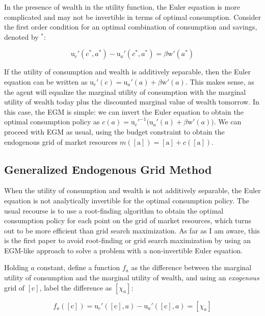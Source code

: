 \documentclass{article}
\newcommand{\DiscFac}{\beta}
\newcommand{\uFunc}{\mathrm{u}}
\newcommand{\aNrm}{a}
\newcommand{\cNrm}{c}
\newcommand{\mNrm}{m}
\newcommand{\wFunc}{\mathrm{w}}
\newcommand{\aMat}{[\mathrm{a}]}
\newcommand{\cMat}{[\mathrm{\cNrm}]}
\newcommand{\xFer}{\chi}
\begin{document}
In the presence of wealth in the utility function, the Euler equation is more complicated and may not be invertible in terms of optimal consumption. Consider the first order condition for an optimal combination of consumption and savings, denoted by $^*$:

\begin{equation}
\uFunc_{c}'(\cNrm^*, \aNrm^*) - \uFunc_{a}'(\cNrm^*, \aNrm^*) = \DiscFac \wFunc'(\aNrm^*)
\end{equation}

If the utility of consumption and wealth is additively separable, then the Euler equation can be written as $\uFunc_{c}'(\cNrm) = \uFunc_{a}'(\aNrm) + \DiscFac \wFunc'(\aNrm)$. This makes sense, as the agent will equalize the marginal utility of consumption with the marginal utility of wealth today plus the discounted marginal value of wealth tomorrow. In this case, the EGM is simple: we can invert the Euler equation to obtain the optimal consumption policy as $\cNrm(\aNrm) = \uFunc_{c}'^{ -1}\big(\uFunc_{a}'(\aNrm) + \DiscFac \wFunc'(\aNrm)\big)$. We can proceed with EGM as usual, using the budget constraint to obtain the endogenous grid of market resources $\mNrm(\aMat) = \aMat + \cNrm(\aMat)$.

\subsection{Generalized Endogenous Grid Method}\label{Generalized Endogenous Grid Method}

When the utility of consumption and wealth is not additively separable, the Euler equation is not analytically invertible for the optimal consumption policy. The usual recourse is to use a root-finding algorithm to obtain the optimal consumption policy for each point on the grid of market resources, which turns out to be more efficient than grid search maximization. As far as I am aware, this is the first paper to avoid root-finding or grid search maximization by using an EGM-like approach to solve a problem with a non-invertible Euler equation.

Holding $\aNrm$ constant, define a function $f_{a}$ as the difference between the marginal utility of consumption and the marginal utility of wealth, and using an \textit{exogenous} grid of $\cMat$, label the difference as $[\xFer_{a}]$:

\begin{equation}
f_{a}(\cMat) = \uFunc_{c}'(\cMat, \aNrm) - \uFunc_{a}'(\cMat, \aNrm) = [\xFer_{a}]
\end{equation}
\end{document}

